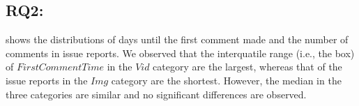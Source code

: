 \subsection*{RQ2: \RQtwo{}}


shows the distributions of days until the first comment made and the number of comments in issue reports. 
We observed that the interquatile range (i.e., the box) of $FirstCommentTime$ in the $Vid$ category are the largest, whereas that of the issue reports in the $Img$ category are the shortest. 
However, the median in the three categories are similar and no significant differences are observed. 

